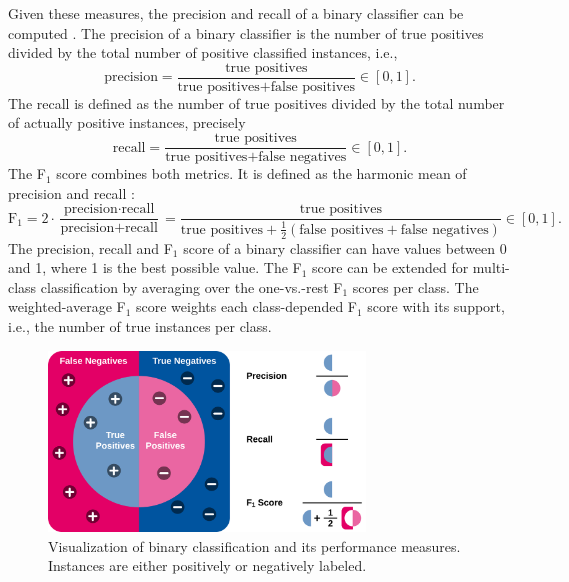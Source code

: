 Given these measures, the precision and recall of a binary classifier can be computed \cite{DBLP:journals/corr/abs-2010-16061}.
The precision of a binary classifier is the number of true positives divided by the total number of positive classified instances, i.e.,
\begin{equation*}
	\textrm{precision} = \dfrac{\textrm{true positives}}{\textrm{true positives} + \textrm{false positives}} \in [0,1].
\end{equation*}
The recall is defined as the number of true positives divided by the total number of actually positive instances, precisely
\begin{equation*}
	\textrm{recall} = \dfrac{\textrm{true positives}}{\textrm{true positives} + \textrm{false negatives}} \in [0,1].
\end{equation*}
The F$_1$ score combines both metrics. It is defined as the harmonic mean of precision and recall \cite{DBLP:journals/corr/abs-2010-16061}:
\begin{equation*}
	\textrm{F}_1= 2 \cdot \dfrac{\textrm{precision} \cdot \textrm{recall}}{\textrm{precision} + \textrm{recall}} = \dfrac{\textrm{true positives}}{\textrm{true positives} + \frac{1}{2} (\textrm{false positives}+\textrm{false negatives})} \in [0,1].
\end{equation*}
The precision, recall and F$_1$ score of a binary classifier can have values between 0 and 1, where 1 is the best possible value.
The F$_1$ score can be extended for multi-class classification by averaging over the one-vs.-rest F$_1$ scores per class.
The weighted-average F$_1$ score weights each class-depended F$_1$ score with its support, i.e., the number of true instances per class.

\begin{figure}[htbp!]
	\centering
	\includegraphics[width=0.75\textwidth]{figures/binary-classification}
	\caption[Visualization of binary classification and its performance measures]{Visualization of binary classification and its performance measures. Instances are either positively or negatively labeled.}
	\label{fig:/binary-classification}
\end{figure}

